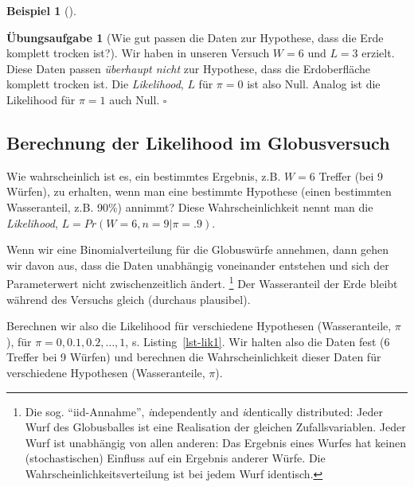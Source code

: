 \documentclass[
  ngerman,
  letterpaper,
  twoside,
  open=any]{scrbook}
\theoremstyle{definition}
\newtheorem{example}{Beispiel}[chapter]
\theoremstyle{plain}
\theoremstyle{definition}
\newtheorem{exercise}{Übungsaufgabe}[chapter]
\theoremstyle{definition}
\theoremstyle{remark}
\begin{document}
\begin{example}[]
\begin{exercise}[Wie gut passen die Daten zur Hypothese, dass die Erde
komplett trocken ist?]
Wir haben in unseren Versuch \(W=6\) und \(L=3\) erzielt. Diese Daten
passen \emph{überhaupt nicht} zur Hypothese, dass die Erdoberfläche
komplett trocken ist. Die \emph{Likelihood}, \(L\) für \(\pi=0\) ist
also Null. Analog ist die Likelihood für \(\pi=1\) auch Null.
\(\square\)

\end{exercise}

\subsection{Berechnung der Likelihood im
Globusversuch}\label{berechnung-der-likelihood-im-globusversuch}

Wie wahrscheinlich ist es, ein bestimmtes Ergebnis, z.B. \(W=6\) Treffer
(bei 9 Würfen), zu erhalten, wenn man eine bestimmte Hypothese (einen
bestimmten Wasseranteil, z.B. 90\%) annimmt? Diese Wahrscheinlichkeit
nennt man die \emph{Likelihood}, \(L = Pr(W = 6, n = 9| \pi=.9)\).

Wenn wir eine Binomialverteilung für die Globuswürfe annehmen, dann
gehen wir davon aus, dass die Daten unabhängig voneinander entstehen und
sich der Parameterwert nicht zwischenzeitlich ändert. \footnote{Die sog.
  \enquote{iid-Annahme}, \emph{i}ndependently and \emph{i}dentically
  distributed: Jeder Wurf des Globusballes ist eine Realisation der
  gleichen Zufallsvariablen. Jeder Wurf ist unabhängig von allen
  anderen: Das Ergebnis eines Wurfes hat keinen (stochastischen)
  Einfluss auf ein Ergebnis anderer Würfe. Die
  Wahrscheinlichkeitsverteilung ist bei jedem Wurf identisch.} Der
Wasseranteil der Erde bleibt während des Versuchs gleich (durchaus
plausibel).

Berechnen wir also die Likelihood für verschiedene Hypothesen
(Wasseranteile, \(\pi\)), für \(\pi = 0, 0.1, 0.2, \ldots, 1\), s.
Listing~\ref{lst-lik1}. Wir halten also die Daten fest (6 Treffer bei 9
Würfen) und berechnen die Wahrscheinlichkeit dieser Daten für
verschiedene Hypothesen (Wasseranteile, \(\pi\)).

\begin{codelisting}

\caption{\label{lst-lik1}Likelihood-Funktion für x=6 Treffer, bei n=9
Würfen, für eine binomialverteilte Zufallsvariable: Wir halten die Daten
fest und variieren den Parameterwert.}

\centering{

}
\end{codelisting}
\end{example}
\end{document}
